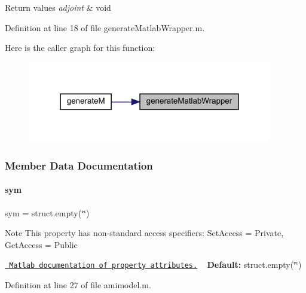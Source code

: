 \begin{DoxyRetVals}{Return values}
{\em adjoint} & void \\
\hline
\end{DoxyRetVals}


Definition at line 18 of file generate\+Matlab\+Wrapper.\+m.

Here is the caller graph for this function\+:
\nopagebreak
\begin{figure}[H]
\begin{center}
\leavevmode
\includegraphics[width=303pt]{classamimodel_aed66701025485d8fa04c20c5bae32a83_icgraph}
\end{center}
\end{figure}


\subsubsection{Member Data Documentation}
\mbox{\label{classamimodel_a3c48fff3d28406486a4f1b5e18da7ca6}} 
\paragraph{\texorpdfstring{sym}{sym}}
{\footnotesize\ttfamily sym = struct.\+empty(\char`\"{}\char`\"{})}

\begin{DoxyNote}{Note}
This property has non-\/standard access specifiers\+: {\ttfamily Set\+Access = Private, Get\+Access = Public} 

\href{http://www.mathworks.com/help/matlab/matlab_oop/property-attributes.html}{\texttt{ Matlab documentation of property attributes.}} ~\newline
{\bfseries{Default\+:}} struct.\+empty(\char`\"{}\char`\"{}) 
\end{DoxyNote}


Definition at line 27 of file amimodel.\+m.

\mbox{\label{classamimodel_a743fa290dbc0a67a3843d5ab0426e9b4}} 
